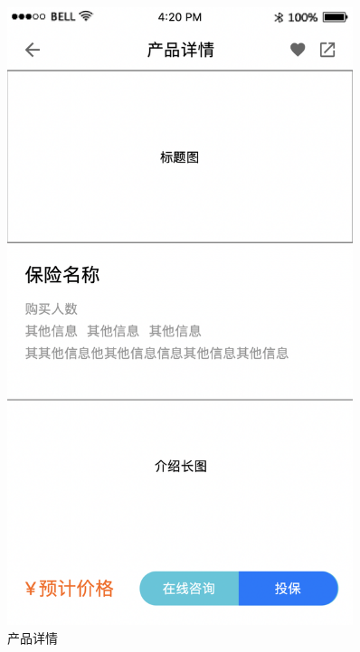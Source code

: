 \documentclass[a4paper]{ctexart}
\begin{document}
\begin{figure}[H]
\begin{minipage}[t]{0.3\textwidth}
  \includegraphics[width=0.9\textwidth]{prototype2}
  \caption{产品详情}
  \end{minipage}
  \begin{minipage}[t]{0.3\textwidth}
  \centering

\end{minipage}
\end{figure}
\end{document}
